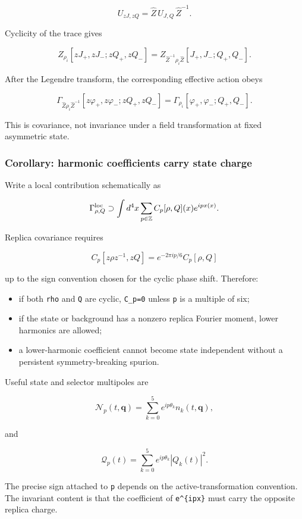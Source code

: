 \documentclass[
  10pt,
  a4paper,
]{article}
\providecommand{\tightlist}{%
  \setlength{\itemsep}{0pt}\setlength{\parskip}{0pt}}
\begin{document}
\[
U_{zJ,zQ}=\widehat Z\,U_{J,Q}\,\widehat Z^{-1}.
\]

Cyclicity of the trace gives

\[
Z_{\rho_i}[zJ_+,zJ_-;zQ_+,zQ_-]
=
Z_{\widehat Z^{-1}\rho_i\widehat Z}[J_+,J_-;Q_+,Q_-].
\]

After the Legendre transform, the corresponding effective action obeys

\[
\boxed{
\Gamma_{\widehat Z\rho_i\widehat Z^{-1}}
[z\varphi_+,z\varphi_-;zQ_+,zQ_-]
=
\Gamma_{\rho_i}[\varphi_+,\varphi_-;Q_+,Q_-].
}
\]

This is covariance, not invariance under a field transformation at fixed
asymmetric state.

\subsubsection{Corollary: harmonic coefficients carry state
charge}\label{corollary-harmonic-coefficients-carry-state-charge}

Write a local contribution schematically as

\[
\Gamma_{\rho,Q}^{\rm loc}
\supset
\int d^4x
\sum_{p\in\mathbb Z}
C_p[\rho,Q](x)e^{ipx(x)}.
\]

Replica covariance requires

\[
C_p[z\rho z^{-1},zQ]
=
e^{-2\pi i p/6}C_p[\rho,Q]
\]

up to the sign convention chosen for the cyclic phase shift. Therefore:

\begin{itemize}
\tightlist
\item
  if both \texttt{rho} and \texttt{Q} are cyclic, \texttt{C\_p=0} unless
  \texttt{p} is a multiple of six;
\item
  if the state or background has a nonzero replica Fourier moment, lower
  harmonics are allowed;
\item
  a lower-harmonic coefficient cannot become state independent without a
  persistent symmetry-breaking spurion.
\end{itemize}

Useful state and selector multipoles are

\[
\mathcal N_p(t,\mathbf q)
=
\sum_{k=0}^{5}e^{ip\theta_k}n_k(t,\mathbf q),
\]

and

\[
\mathcal Q_p(t)
=
\sum_{k=0}^{5}e^{ip\theta_k}|Q_k(t)|^2.
\]

The precise sign attached to \texttt{p} depends on the
active-transformation convention. The invariant content is that the
coefficient of \texttt{e\^{}\{ipx\}} must carry the opposite replica
charge.
\end{document}
